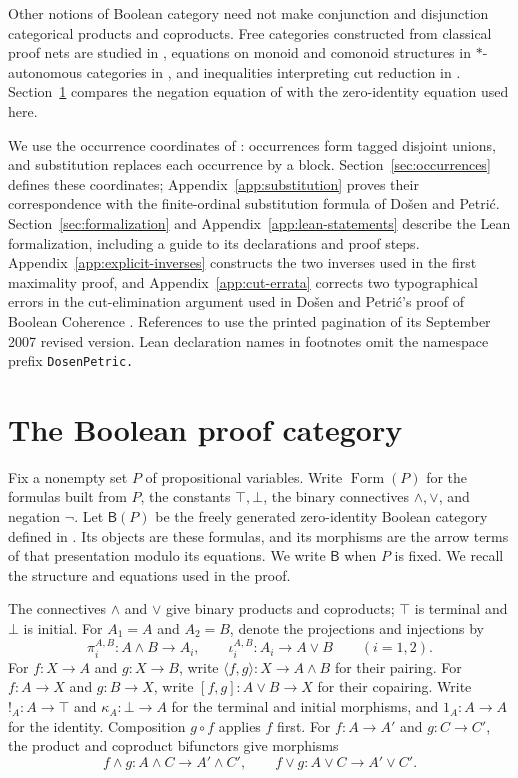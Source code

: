 \documentclass[11pt]{article}
\newcommand{\B}{\mathsf B}
\newcommand{\FormulaSet}{\operatorname{Form}}
\begin{document}
Other notions of Boolean category need not make conjunction and
disjunction categorical products and coproducts. Free categories constructed from classical proof nets
are studied in \cite[Theorem~3.5.4]{LSFree}, equations on monoid
and comonoid structures in $*$-autonomous categories in
\cite{Strassburger}, and inequalities interpreting cut reduction
in \cite{FP}. Section~\ref{sec:category} compares the negation
equation of \cite{FP} with the zero-identity equation used here.

We use the occurrence coordinates of \cite[\S9]{Notation}:
occurrences form tagged disjoint unions, and substitution replaces
each occurrence by a block. Section~\ref{sec:occurrences} defines
these coordinates; Appendix~\ref{app:substitution} proves their
correspondence with the finite-ordinal substitution formula of
Do\v{s}en and Petri\'c. Section~\ref{sec:formalization} and
Appendix~\ref{app:lean-statements} describe the Lean formalization,
including a guide to its declarations and proof steps.
Appendix~\ref{app:explicit-inverses} constructs the two inverses
used in the first maximality proof, and
Appendix~\ref{app:cut-errata} corrects two typographical errors
in the cut-elimination argument used in Do\v{s}en and Petri\'c's
proof of Boolean Coherence \cite{DP}.
References to \cite{DP} use the printed pagination of its
September 2007 revised version. Lean declaration names in footnotes
omit the namespace prefix \texttt{DosenPetric.}

\section{The Boolean proof category}\label{sec:category}

Fix a nonempty set $P$ of propositional variables. Write $\FormulaSet(P)$
for the formulas built from $P$, the constants $\top,\bot$, the binary
connectives $\wedge,\vee$, and negation $\neg$. Let $\B(P)$ be the
freely generated zero-identity Boolean category defined in
\cite[\S\S14.2--14.3]{DP}. Its objects are these formulas, and its
morphisms are the arrow terms of that presentation modulo its equations.
We write $\B$ when $P$ is fixed. We recall the structure and equations
used in the proof.

The connectives $\wedge$ and $\vee$ give binary products and coproducts;
$\top$ is terminal and $\bot$ is initial. For $A_1=A$ and $A_2=B$,
denote the projections and injections by
\[
 \pi_i^{A,B}:A\wedge B\longrightarrow A_i,
 \qquad
 \iota_i^{A,B}:A_i\longrightarrow A\vee B
 \qquad(i=1,2).
\]
For $f:X\to A$ and $g:X\to B$, write
$\langle f,g\rangle:X\to A\wedge B$ for their pairing.
For $f:A\to X$ and $g:B\to X$, write
$[f,g]:A\vee B\to X$ for their copairing. Write
$!_A:A\to\top$ and $\kappa_A:\bot\to A$ for the terminal and initial
morphisms, and $1_A:A\to A$ for the identity. Composition $g\circ f$
applies $f$ first. For $f:A\to A'$ and $g:C\to C'$, the product and
coproduct bifunctors give morphisms
\[
 f\wedge g:A\wedge C\longrightarrow A'\wedge C',
 \qquad f\vee g:A\vee C\longrightarrow A'\vee C'.
\]
\end{document}
